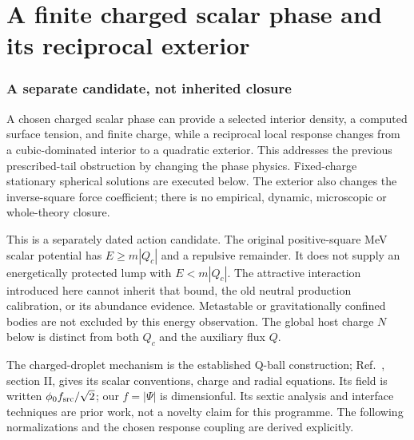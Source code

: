 \documentclass[11pt]{article}
\begin{document}
\part{A finite charged scalar phase and its reciprocal exterior}

\section{A separate candidate, not inherited closure}
A chosen charged scalar phase can provide a selected interior density,
a computed surface tension, and finite charge, while a reciprocal local
response changes from a cubic-dominated interior to a quadratic exterior.
This addresses the previous prescribed-tail obstruction by changing the
phase physics. Fixed-charge stationary spherical solutions are executed
below. The exterior also changes the inverse-square force coefficient;
there is no empirical, dynamic, microscopic or whole-theory closure.

This is a separately dated action candidate. The original positive-square
MeV scalar potential has $E\ge m|Q_c|$ and a repulsive remainder. It does
not supply an energetically protected lump with $E<m|Q_c|$. The attractive
interaction introduced here cannot inherit that bound, the old neutral
production calibration, or its abundance evidence. Metastable or
gravitationally confined bodies are not excluded by this energy observation.
The global host charge $N$ below is distinct from both $Q_c$ and the
auxiliary flux $Q$.

The charged-droplet mechanism is the established Q-ball construction;
Ref.~\cite{PIqball}, section II, gives its scalar conventions, charge and
radial equations. Its field is written $\phi_0 f_{\rm src}/\sqrt2$;
our $f=|\Psi|$ is dimensionful. Its sextic analysis and interface techniques
are prior work, not a novelty claim for this programme. The following
normalizations and the chosen response coupling are derived explicitly.
\end{document}
